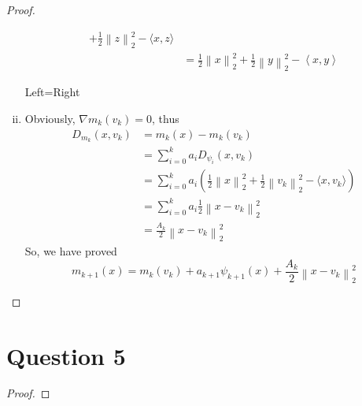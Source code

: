 \documentclass{article}
\begin{document}
\begin{proof}
\begin{enumerate}[(i)]
\begin{align*}
                    +\frac{1}{2}\left\lVert z \right \rVert_2^2
                    -\langle x,z \rangle\\
                &=\frac{1}{2}\left\lVert x \right \rVert_2^2
                +\frac{1}{2}\left\lVert y \right \rVert_2^2
                -\left\langle x,y \right\rangle
            \end{align*}
            \begin{center}
                Left=Right
            \end{center}
            \item Obviously, $\nabla m_k(v_k)=0$, thus
            \begin{align*}
                D_{m_k}(x,v_k)&=m_k(x)-m_k(v_k)\\
                &=\sum_{i=0}^k a_i D_{\psi_i}(x,v_k)\\
                &=\sum_{i=0}^k a_i \left(
                    \frac{1}{2}\left\lVert x \right \rVert_2^2
                    +\frac{1}{2}\left\lVert v_k \right \rVert_2^2
                    -\langle x,v_k \rangle
                    \right)\\
                &=\sum_{i=0}^k a_i \frac{1}{2}\left\lVert x-v_k \right \rVert_2^2\\
                &=\frac{A_k}{2}\left\lVert x-v_k \right \rVert_2^2
            \end{align*}
            So, we have proved
            $$m_{k+1}(x)=m_k(v_k)+a_{k+1}\psi_{k+1}(x)+\frac{A_k}{2}\left\lVert x-v_k \right \rVert_2^2$$
        \end{enumerate}
    \end{proof}


\section*{Question 5}
    \begin{proof}
        
    \end{proof}
\end{document}
